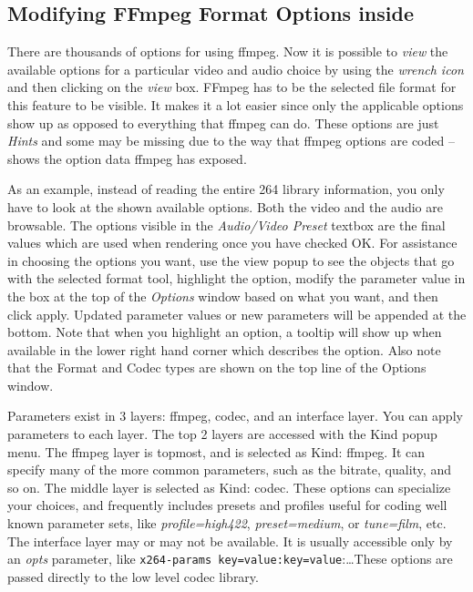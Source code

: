 \subsection{Modifying FFmpeg Format Options inside \CGG{}}%
\label{sub:modifying_ffmpeg_cinelerra}

There are thousands of options for using ffmpeg.  Now it is possible to \textit{view} the available options for a particular video and audio choice by using the \textit{wrench icon} and then clicking on the \textit{view} box.  FFmpeg has to be the selected file format for this feature to be visible.  It makes it a lot easier since only the applicable options show up as opposed to everything that ffmpeg can do.  These options are just \textit{Hints} and some may be missing due to the way that ffmpeg options are coded -- \CGG{} shows the option data ffmpeg has exposed.

As an example, instead of reading the entire 264 library
information, you only have to look at the shown available options.
Both the video and the audio are browsable. The options visible in
the \textit{Audio/Video Preset} textbox are the final values which
are used when rendering once you have checked OK\@.  For assistance
in choosing the options you want, use the view popup to see the
objects that go with the selected format tool, highlight the option,
modify the parameter value in the box at the top of the
\textit{Options} window based on what you want, and then click
apply.  Updated parameter values or new parameters will be appended
at the bottom.  Note that when you highlight an option, a tooltip
will show up when available in the lower right hand corner which
describes the option.  Also note that the Format and Codec types are
shown on the top line of the Options window.

Parameters exist in 3 layers: ffmpeg, codec, and an interface layer.  You can apply parameters to each layer.  The top 2 layers are accessed with the Kind popup menu. The ffmpeg layer is topmost, and is selected as Kind: ffmpeg.  It can specify many of the more common parameters, such as the bitrate, quality, and so on.  The middle layer is selected as Kind: codec.  These options can specialize your choices, and frequently includes presets and profiles useful for coding well known parameter sets, like \textit{profile=high422}, \textit{preset=medium}, or \textit{tune=film}, etc.   The interface layer may or may not be available.  It is usually accessible only by an \textit{opts} parameter, like \texttt{x264-params key=value:key=value}:\dots  These options are passed directly to the low level codec library.

